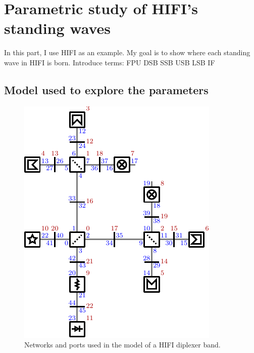 \cleardoublepage
\chapter{Parametric study of HIFI's standing waves}

In this part, I use HIFI as an example.
My goal is to show where each standing wave in HIFI is born.
Introduce terms:
FPU
DSB
SSB
USB
LSB
IF


\section{Model used to explore the parameters}

\begin{figure}[hbtp]
    \centering
    \includegraphics{ports_diplexerband}
    \caption{Networks and ports used in the model of a HIFI diplexer band.}
    \label{fig:ports_diplexerband}
\end{figure}

